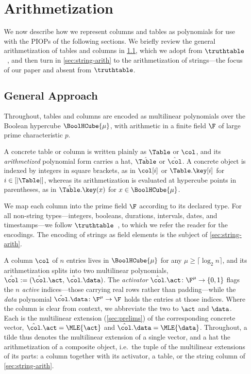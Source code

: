 \doclearpage
\section{Arithmetization}
\label{sec:arithmetization}


We now describe how we represent columns and tables as polynomials for use with the PIOPs of the following sections. 
We briefly review the general arithmetization of tables and columns in \cref{sec:general-approach}, which we adopt from $\truthtable$~\cite{cryptoeprint:2026/1260}, and then turn in \cref{sec:string-arith} to the arithmetization of strings---the focus of our paper and absent from $\truthtable$.

\subsection{General Approach}
\label{sec:general-approach}
Throughout, tables and columns are encoded as multilinear polynomials over the Boolean hypercube $\BoolHCube{\mu}$, with arithmetic in a finite field $\F$ of large prime characteristic $p$.

A concrete table or column is written plainly as $\Table$ or $\col$, and its \emph{arithmetized} polynomial form carries a hat, $\hat{\Table}$ or $\hat{\col}$. A concrete object is indexed by integers in square brackets, as in $\col[i]$ or $\Table.\key[i]$ for $i \in [|\Table|]$, whereas its arithmetization is evaluated at hypercube points in parentheses, as in $\hat{\Table}.\key(x)$ for $x \in \BoolHCube{\mu}$.

We map each column into the prime field $\F$ according to its declared type. For all non-string types---integers, booleans, durations, intervals, dates, and timestamps---we follow $\truthtable$~\cite{cryptoeprint:2026/1260}, to which we refer the reader for the encodings.
The encoding of strings as field elements is the subject of \cref{sec:string-arith}.

A column $\col$ of $n$ entries lives in $\BoolHCube{\mu}$ for any $\mu \ge \lceil \log_2 n \rceil$, and its arithmetization splits into two multilinear polynomials, $\hat{\col} := (\hat{\col}.\act,\, \hat{\col}.\data)$. The \emph{activator} $\hat{\col}.\act \colon \F^{\mu} \to \{0,1\}$ flags the $n$ \emph{active} indices---those carrying real rows rather than padding---while the \emph{data} polynomial $\hat{\col}.\data \colon \F^{\mu} \to \F$ holds the entries at those indices. Where the column is clear from context, we abbreviate the two to $\act$ and $\data$. Each is the multilinear extension (\cref{sec:prelims}) of the corresponding concrete vector, $\hat{\col}.\act = \MLE{\act}$ and $\hat{\col}.\data = \MLE{\data}$. Throughout, a tilde thus denotes the multilinear extension of a single vector, and a hat the arithmetization of a composite object, i.e.\ the tuple of the multilinear extensions of its parts: a column together with its activator, a table, or the string column of \cref{sec:string-arith}.

